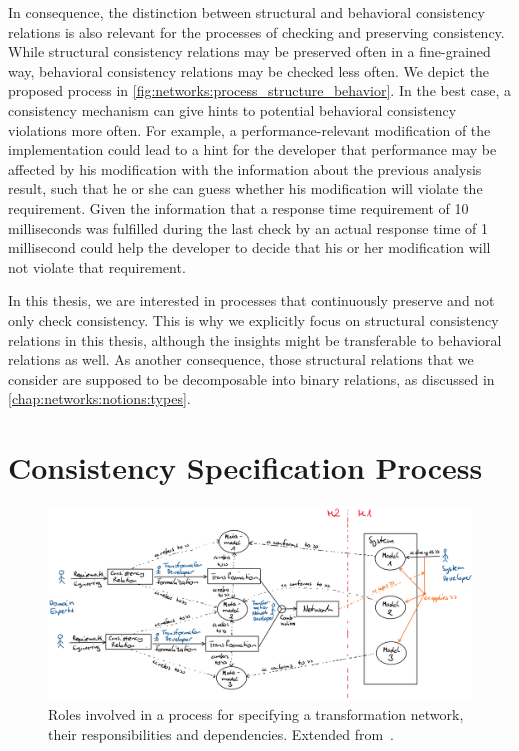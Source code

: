 In consequence, the distinction between structural and behavioral consistency relations is also relevant for the processes of checking and preserving consistency.
While structural consistency relations may be preserved often in a fine-grained way, behavioral consistency relations may be checked less often.
We depict the proposed process in \autoref{fig:networks:process_structure_behavior}.
In the best case, a consistency mechanism can give hints to potential behavioral consistency violations more often.
For example, a performance-relevant modification of the implementation could lead to a hint for the developer that performance may be affected by his modification with the information about the previous analysis result, such that he or she can guess whether his modification will violate the requirement.
Given the information that a response time requirement of 10 milliseconds was fulfilled during the last check by an actual response time of 1 millisecond could help the developer to decide that his or her modification will not violate that requirement.

In this thesis, we are interested in processes that continuously preserve and not only check consistency.
This is why we explicitly focus on structural consistency relations in this thesis, although the insights might be transferable to behavioral relations as well.
As another consequence, those structural relations that we consider are supposed to be decomposable into binary relations, as discussed in \autoref{chap:networks:notions:types}.



\section{Consistency Specification Process}
\label{chap:networks:specification_process}

\begin{figure}
    \centering
    \includegraphics[width=\textwidth]{figures/prologue/networks/roles_and_process}
    \caption[Roles in a transformation network specification process]{Roles involved in a process for specifying a transformation network, their responsibilities and dependencies. Extended from~.}
    \label{fig:networks:roles_and_process}
\end{figure}

